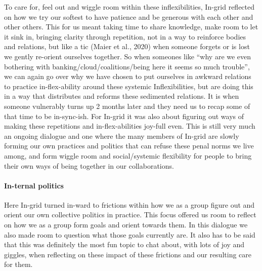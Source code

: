 To care for, feel out and wiggle room within these inflexibilities,
In-grid reflected on how we try our softest to have patience and be
generous with each other and other others. This for us meant taking time
to share knowledge, make room to let it sink in, bringing clarity
through repetition, not in a way to reinforce bodies and relations, but
like a tic (Maier et al., 2020) when someone forgets or is lost we
gently re-orient ourselves together. So when someones like ``why are we
even bothering with banking/cloud/coalitions/being here it seems so much
trouble'', we can again go over why we have chosen to put ourselves in
awkward relations to practice in-flex-ability around these systemic
Inflexibilities, but are doing this in a way that distributes and
reforms these sedimented relations. It is when someone vulnerably turns
up 2 months later and they need us to recap some of that time to be
in-sync-ish. For In-grid it was also about figuring out ways of making
these repetitions and in-flex-abilities joy-full even. This is still
very much an ongoing dialogue and one where the many members of In-grid
are slowly forming our own practices and politics that can refuse these
penal norms we live among, and form wiggle room and social/systemic
flexibility for people to bring their own ways of being together in our
collaborations.

\hypertarget{in-ternal-politics}{%
\paragraph{In-ternal politics}\label{in-ternal-politics}}

Here In-grid turned in-ward to frictions within how we as a group figure
out and orient our own collective politics in practice. This focus
offered us room to reflect on how we as a group form goals and orient
towards them. In this dialogue we also made room to question what those
goals currently are. It also has to be said that this was definitely the
most fun topic to chat about, with lots of joy and giggles, when
reflecting on these impact of these frictions and our resulting care for
them.

